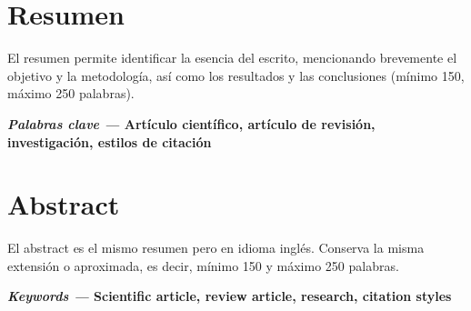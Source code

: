 \pagestyle{fancy}
\section*{Resumen}

\noindent El resumen permite identificar la esencia del escrito, mencionando brevemente el objetivo y la metodología, así como los resultados y las conclusiones (mínimo 150, máximo 250 palabras).


\vspace{1cm}\textbf{\textit{Palabras clave ---} Artículo científico, artículo de revisión, investigación, estilos de citación}



\newpage

\section*{Abstract}

\noindent El abstract es el mismo resumen pero en idioma inglés. Conserva la misma extensión o aproximada, es decir, mínimo 150 y máximo 250 palabras.


\vspace{1cm}\textbf{\textit{Keywords ---} Scientific article, review article, research, citation styles}


\newpage

